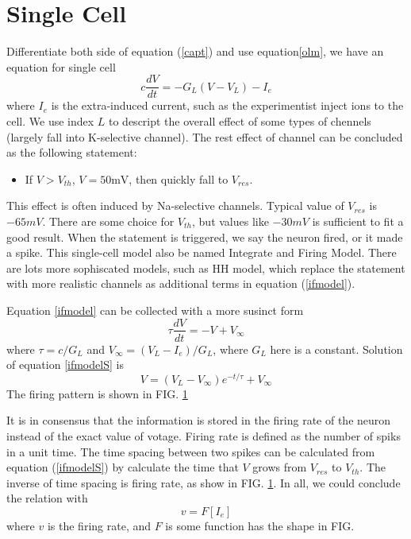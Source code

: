 \documentclass[11pt]{article}
\begin{document}
\section{Single Cell}

Differentiate both side of equation (\ref{capt}) and use equation{\ref{olm}}, we
have an equation for single cell
\begin{equation}
  c \frac{dV}{dt} = - G_L (V - V_L) - I_e
  \label{ifmodel}
\end{equation}
where $I_e$ is the extra-induced current, such as the experimentist inject ions
to the cell. We use index $L$ to descript the overall effect of some types of
chennels (largely fall into K-selective channel). The rest effect of channel can
be concluded as the following statement:
\begin{itemize}
\item{} If $V > V_{th}$, $V = 50 \text{mV}$, then quickly fall to $V_{res}$.
  \label{ifstate}
\end{itemize}
This effect is often induced by Na-selective channels. Typical value of
$V_{res}$ is $-65 mV$. There are some choice for $V_{th}$, but values like $-30
mV$ is sufficient to fit a good result. When the statement is triggered, we say
the neuron fired, or it made a spike. This single-cell model also be named
Integrate and Firing Model. There are lots more sophiscated models, such as HH
model, which replace the statement with more realistic channels as
additional terms in equation (\ref{ifmodel}).

Equation \ref{ifmodel} can be collected with a more susinct form
\begin{equation}
  \tau \frac{dV}{dt} = -V + V_{\infty}
  \label{ifmodelS}
\end{equation}
where $\tau = c / G_L$ and $V_{\infty} = (V_L - I_e) / G_L$, where $G_L$ here is
a constant. Solution of equation \ref{ifmodelS} is
\begin{equation}
  V = (V_L - V_{\infty}) e^{-t/\tau} + V_{\infty}
\end{equation}
The firing pattern is shown in FIG. \ref{}

It is in consensus that the information is stored in the firing rate of the
neuron instead of the exact value of votage. Firing rate is defined as the
number of spiks in a unit time. The time spacing between two spikes can be
calculated from equation (\ref{ifmodelS}) by calculate the time that $V$ grows
from $V_{res}$ to $V_{th}$. The inverse of time spacing is firing rate, as show
in FIG. \ref{}. In all, we could conclude the relation with
\begin{equation}
  v = F[I_e]
\end{equation}
where $v$ is the firing rate, and $F$ is some function has the shape in FIG.
\end{document}
